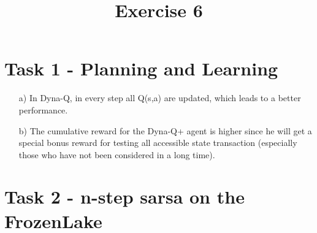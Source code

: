 \documentclass[a4paper]{article}
\date{}
\author{}
\title{\textbf{Exercise 6}}
\begin{document}
\maketitle 
\thispagestyle{fancy}

\section*{Task 1 - Planning and Learning}

\begin{enumerate}
	\item[a)] In Dyna-Q, in every step all Q(s,a) are updated, which leads to a better performance.
	\item[b)] The cumulative reward for the Dyna-Q+ agent is higher since he will get a special bonus reward for testing all accessible state transaction (especially those who have not been considered in a long time). 
\end{enumerate}

\section*{Task 2 - n-step sarsa on the FrozenLake}
\end{document}
